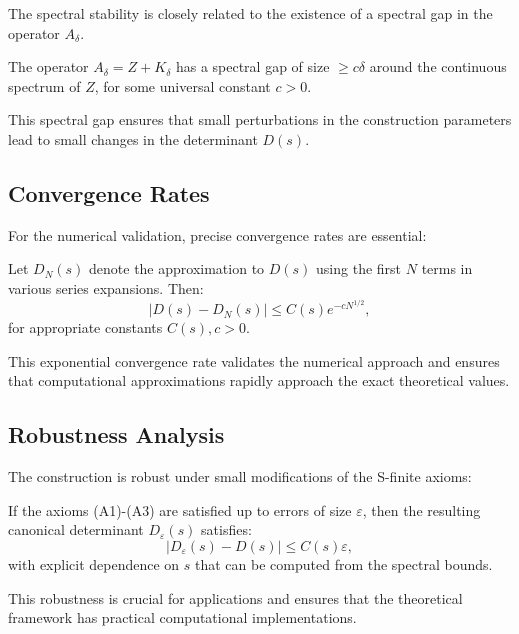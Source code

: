 The spectral stability is closely related to the existence of a spectral gap in the operator \( A_\delta \).

\begin{lemma}
The operator \( A_\delta = Z + K_\delta \) has a spectral gap of size \( \geq c\delta \) around the continuous spectrum of \( Z \), for some universal constant \( c > 0 \).
\end{lemma}

This spectral gap ensures that small perturbations in the construction parameters lead to small changes in the determinant \( D(s) \).

\subsection{Convergence Rates}

For the numerical validation, precise convergence rates are essential:

\begin{theorem}
Let \( D_N(s) \) denote the approximation to \( D(s) \) using the first \( N \) terms in various series expansions. Then:
\[
|D(s) - D_N(s)| \leq C(s) e^{-cN^{1/2}},
\]
for appropriate constants \( C(s), c > 0 \).
\end{theorem}

This exponential convergence rate validates the numerical approach and ensures that computational approximations rapidly approach the exact theoretical values.

\subsection{Robustness Analysis}

The construction is robust under small modifications of the S-finite axioms:

\begin{corollary}[Robustness]
If the axioms (A1)-(A3) are satisfied up to errors of size \( \varepsilon \), then the resulting canonical determinant \( D_\varepsilon(s) \) satisfies:
\[
|D_\varepsilon(s) - D(s)| \leq C(s) \varepsilon,
\]
with explicit dependence on \( s \) that can be computed from the spectral bounds.
\end{corollary}

This robustness is crucial for applications and ensures that the theoretical framework has practical computational implementations.